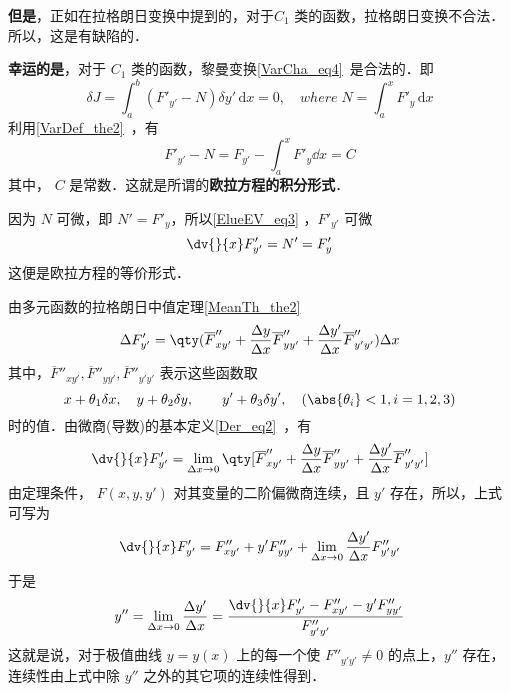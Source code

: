 \textbf{但是}，正如在拉格朗日变换中提到的，对于$C_1$ 类的函数，拉格朗日变换不合法．所以，这是有缺陷的．

\textbf{幸运的是}，对于 $C_1$ 类的函数，黎曼变换\autoref{VarCha_eq4}~是合法的．即
\begin{equation}
\delta J=\int_a^b \left(F'_{y'}-N \right) \delta y' \,\mathrm{d}{x}=0  ,\quad where \;N=\int_a^xF'_y \,\mathrm{d}{x} 
\end{equation}
利用\autoref{VarDef_the2}~，有
\begin{equation}\label{ElueEV_eq3}
F'_{y'}-N=F_{y'}-\int_a^xF'_y\dd x=C
\end{equation}
其中， $C$ 是常数．这就是所谓的\textbf{欧拉方程的积分形式}．

因为 $N$ 可微，即 $N'=F'_y$，所以\autoref{ElueEV_eq3} ，$F'_{y'}$ 可微
\begin{equation}
\dv{}{x}F'_{y'}=N'=F'_y
\end{equation}
这便是欧拉方程的等价形式．

由多元函数的拉格朗日中值定理\autoref{MeanTh_the2}~
\begin{equation}
\Delta F'_{y'}=\qty(\overline{F}''_{xy'}+\frac{\Delta y}{\Delta x}\overline{F}''_{yy'}+\frac{\Delta y'}{\Delta x}\overline{F}''_{y'y'})\Delta x
\end{equation}
其中，$\overline{F}''_{xy'},\overline{F}''_{yy'},\overline{F}''_{y'y'}$ 表示这些函数取
\begin{equation}
x+\theta_1\delta x,\quad y+\theta_2\delta y,\quad \quad y'+\theta_3\delta y',\quad (\abs{\theta_i}<1,i=1,2,3)
\end{equation}
时的值．由微商(导数)的基本定义\autoref{Der_eq2}~，有
\begin{equation}
\dv{}{x}F'_{y'}=\lim_{\Delta x\rightarrow 0}\qty[\overline{F}''_{xy'}+\frac{\Delta y}{\Delta x}\overline{F}''_{yy'}+\frac{\Delta y'}{\Delta x}\overline{F}''_{y'y'}]
\end{equation}
由定理条件， $F(x,y,y')$ 对其变量的二阶偏微商连续，且 $y'$ 存在，所以，上式可写为
\begin{equation}
\dv{}{x}F'_{y'}=F''_{xy'}+y'F''_{yy'}+\lim_{\Delta x\rightarrow0}\frac{\Delta y'}{\Delta x}F''_{y'y'}
\end{equation}
于是
\begin{equation}
y''=\lim_{\Delta x\rightarrow0}\frac{\Delta y'}{\Delta x}=\frac{\dv{}{x}F'_{y'}-F''_{xy'}-y'F''_{yy'}}{F''_{y'y'}}
\end{equation}
这就是说，对于极值曲线 $y=y(x)$ 上的每一个使 $F''_{y'y'}\neq0$ 的点上，$y''$ 存在，连续性由上式中除 $y''$ 之外的其它项的连续性得到．